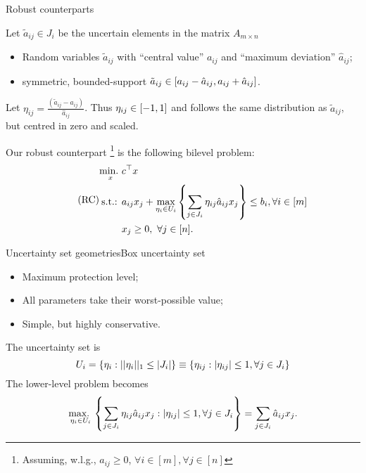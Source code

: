 \begin{frame}{Robust counterparts}

	Let $\tilde{a}_{ij} \in J_i$ be the \alert{uncertain elements} in the matrix $A_{m \times n}$ 
	\vspace{-6pt}
	\begin{itemize}
		\item Random variables $\tilde{a}_{ij}$ with ``central value'' $a_{ij}$ and ``maximum deviation'' $\hat{a}_{ij}$;
		\item symmetric, bounded-support $\tilde{a}_{ij} \in \left[ a_{ij} - \hat{a}_{ij} , a_{ij} + \hat{a}_{ij} \right]$.
	\end{itemize}
	
	\pause
	Let $\eta_{ij} = \frac{(\tilde{a}_{ij} - a_{ij})}{\hat{a}_{ij}}$. Thus $\eta_{ij} \in \left[ -1,1 \right]$ and follows the \alert{same distribution} as $\tilde{a}_{ij}$, but centred in zero and scaled. 
 	
 	\pause
	Our \alert{robust counterpart}%
	\footnote{Assuming, w.l.g., $a_{ij} \ge 0$, $\forall i \in [m], \forall j \in [n]$}
	 is the following \alert{bilevel} problem:
	\begin{equation} \tag{RC}
		\begin{aligned}
			\mathop{\text{min.} \ }_x & c^\top x \\
			\text{s.t.: } & a_{ij}x_j + \max_{\eta_i \in U_i} \left\{ \sum_{j \in J_i}\eta_{ij}\hat{a}_{ij}x_j \right \} \le b_i, \forall i \in [m] \\
			& x_j \ge 0, \ \forall j \in [n].			
		\end{aligned}
	\end{equation}
\end{frame}

\begin{frame}{Uncertainty set geometries}{Box uncertainty set \cite{soyster1973convex}}

	\begin{itemize}
		\item \alert{Maximum} protection level;
		\item All parameters take their worst-possible value;
		\item Simple, but highly conservative.
	\end{itemize}

	The \alert{uncertainty set} is
	$$
		U_i = \left\{ \eta_i : ||\eta_i||_1 \le |J_i| \right \} \equiv \left\{ \eta_{ij} : |\eta_{ij}| \le 1, \forall j \in J_i \right \}
	$$
	\pause
	The \alert{lower-level problem} becomes
	\begin{equation*}
		\mathop{\text{max.} \ }_{\eta_i \in U_i}\left\{ \sum_{j \in J_i} \eta_{ij}\hat{a}_{ij}x_j : |\eta_{ij}| \le 1, \forall j \in J_i \right \} = \sum_{j \in J_i}\hat{a}_{ij}x_j.
	\end{equation*}	

\end{frame}

